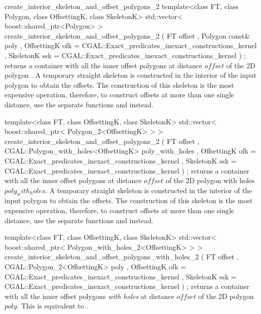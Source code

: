 \begin{ccRefFunction}{create_interior_skeleton_and_offset_polygons_2}
\ccFunction
{template<class FT, class Polygon, class OffsettingK, class SkeletonK>
std::vector< boost::shared_ptr<Polygon> >
create_interior_skeleton_and_offset_polygons_2 ( FT             offset
                                               , Polygon const& poly
                                               , OffsettingK     ofk 
                                                  = CGAL::Exact_predicates_inexact_constructions_kernel
                                               , SkeletonK      ssk 
                                                  = CGAL::Exact_predicates_inexact_constructions_kernel
                                               ) ;
}
{returns a container with all the inner offset polygons at distance $offset$ of the 2D polygon .
A temporary straight skeleton is constructed in the interior of the input polygon to obtain the offsets. The construction of this skeleton is the most expensive operation, therefore, to construct offsets at more than one single distance, use the separate functions  and  instead.}





\ccFunction
{template<class FT, class OffsettingK, class SkeletonK>
std::vector< boost::shared_ptr< Polygon_2<OffsettingK> > >
create_interior_skeleton_and_offset_polygons_2 ( FT offset
                                               , CGAL::Polygon_with_holes<OffsettingK> poly_with_holes
                                               , OffsettingK ofk 
                                                  = CGAL::Exact_predicates_inexact_constructions_kernel
                                               , SkeletonK ssk 
                                                  = CGAL::Exact_predicates_inexact_constructions_kernel
                                    ) ;
}
{returns a container with all the inner offset polygons at distance $offset$ of the 2D polygon with holes $poly_with_holes$.
A temporary straight skeleton is constructed in the interior of the input polygon to obtain the offsets. The construction of this skeleton is the most expensive operation, therefore, to construct offsets at more than one single distance, use the separate functions  and  instead.}

\ccFunction
{template<class FT, class OffsettingK, class SkeletonK>
std::vector< boost::shared_ptr< Polygon_with_holes_2<OffsettingK> > >
create_interior_skeleton_and_offset_polygons_with_holes_2 
  ( FT offset
  , CGAL::Polygon_2<OffsettingK> poly
  , OffsettingK ofk = CGAL::Exact_predicates_inexact_constructions_kernel
  , SkeletonK ssk   = CGAL::Exact_predicates_inexact_constructions_kernel
  ) ;
}
{returns a container with all the inner offset polygons {\em with holes} at distance $offset$ of the 2D polygon $poly$.
This is equivalent to .}


\end{ccRefFunction}
